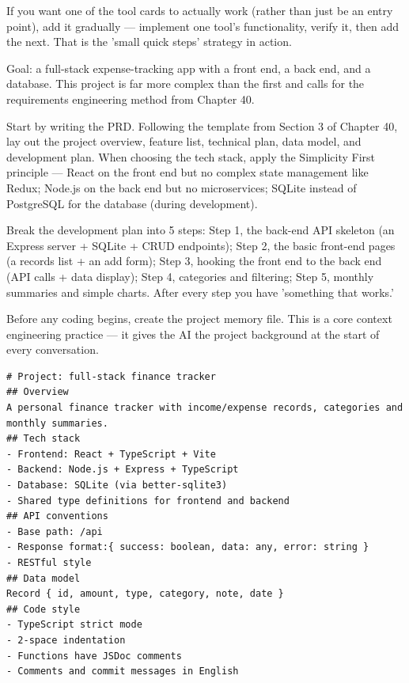 If you want one of the tool cards to actually work (rather than just be an entry point), add it gradually — implement one tool's functionality, verify it, then add the next. That is the 'small quick steps' strategy in action.



Goal: a full-stack expense-tracking app with a front end, a back end, and a database. This project is far more complex than the first and calls for the requirements engineering method from Chapter 40.

Start by writing the PRD. Following the template from Section 3 of Chapter 40, lay out the project overview, feature list, technical plan, data model, and development plan. When choosing the tech stack, apply the Simplicity First principle — React on the front end but no complex state management like Redux; Node.js on the back end but no microservices; SQLite instead of PostgreSQL for the database (during development).

Break the development plan into 5 steps: Step 1, the back-end API skeleton (an Express server + SQLite + CRUD endpoints); Step 2, the basic front-end pages (a records list + an add form); Step 3, hooking the front end to the back end (API calls + data display); Step 4, categories and filtering; Step 5, monthly summaries and simple charts. After every step you have 'something that works.'


Before any coding begins, create the project memory file. This is a core context engineering practice — it gives the AI the project background at the start of every conversation.

\begin{lstlisting}
# Project: full-stack finance tracker
## Overview
A personal finance tracker with income/expense records, categories and monthly summaries.
## Tech stack
- Frontend: React + TypeScript + Vite
- Backend: Node.js + Express + TypeScript
- Database: SQLite (via better-sqlite3)
- Shared type definitions for frontend and backend
## API conventions
- Base path: /api
- Response format:{ success: boolean, data: any, error: string }
- RESTful style
## Data model
Record { id, amount, type, category, note, date }
## Code style
- TypeScript strict mode
- 2-space indentation
- Functions have JSDoc comments
- Comments and commit messages in English
\end{lstlisting}

